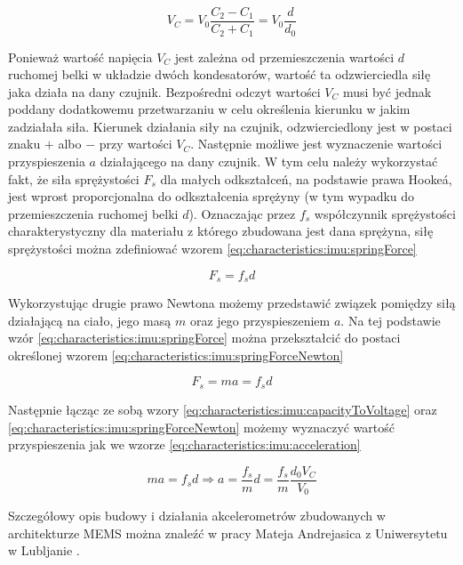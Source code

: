 \begin{equation}
	V_C = V_0 \frac{C_2-C_1}{C_2+C_1} = V_0\frac{d}{d_0}
	\label{eq:characteristics:imu:capacityToVoltage}
\end{equation}
	
Ponieważ wartość napięcia $V_C$ jest zależna od przemieszczenia wartości $d$ ruchomej belki w układzie dwóch kondesatorów, wartość ta odzwierciedla siłę jaka działa na dany czujnik. Bezpośredni odczyt wartości $V_C$ musi być jednak poddany dodatkowemu przetwarzaniu w celu określenia kierunku w jakim zadziałała siła. Kierunek działania siły na czujnik, odzwierciedlony jest w postaci znaku $+$ albo $-$ przy wartości $V_C$. Następnie możliwe jest wyznaczenie wartości przyspieszenia $a$ działającego na dany czujnik. W tym celu należy wykorzystać fakt, że siła sprężystości $F_s$ dla małych odkształceń, na podstawie prawa Hooke\'a, jest wprost proporcjonalna do odkształcenia sprężyny (w tym wypadku do przemieszczenia ruchomej belki $d$). Oznaczając przez $f_s$ współczynnik sprężystości charakterystyczny dla materiału z którego zbudowana jest dana sprężyna, siłę sprężystości można zdefiniować wzorem \eqref{eq:characteristics:imu:springForce}

\begin{equation}
	F_s = f_s d
	\label{eq:characteristics:imu:springForce}
\end{equation}	
	
Wykorzystując drugie prawo Newtona możemy przedstawić związek pomiędzy siłą działającą na ciało, jego masą $m$ oraz jego przyspieszeniem $a$. Na tej podstawie wzór \eqref{eq:characteristics:imu:springForce} można przekształcić do postaci określonej wzorem \eqref{eq:characteristics:imu:springForceNewton}

\begin{equation}
	F_s = ma = f_s d
	\label{eq:characteristics:imu:springForceNewton}
\end{equation}	

Następnie łącząc ze sobą wzory \eqref{eq:characteristics:imu:capacityToVoltage} oraz \eqref{eq:characteristics:imu:springForceNewton} możemy wyznaczyć wartość przyspieszenia jak we wzorze \eqref{eq:characteristics:imu:acceleration}

\begin{equation}
	ma = f_s d \Rightarrow a = \frac{f_s}{m} d = \frac{f_s}{m} \frac{d_0 V_C}{V_0}
	\label{eq:characteristics:imu:acceleration}
\end{equation}

Szczegółowy opis budowy i działania akcelerometrów zbudowanych w architekturze MEMS można znaleźć w pracy Mateja Andrejasica z Uniwersytetu w Lubljanie \cite{Andrejasic2008}.

